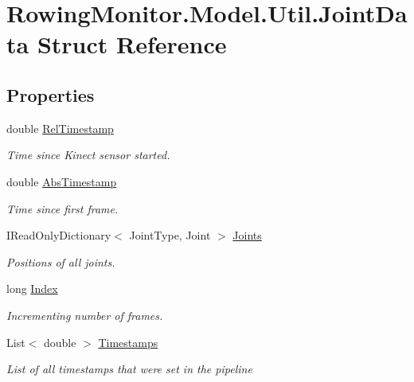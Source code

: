 \hypertarget{struct_rowing_monitor_1_1_model_1_1_util_1_1_joint_data}{}\section{Rowing\+Monitor.\+Model.\+Util.\+Joint\+Data Struct Reference}
\label{struct_rowing_monitor_1_1_model_1_1_util_1_1_joint_data}
\subsection*{Properties}
\begin{DoxyCompactItemize}
\item 
double \hyperlink{struct_rowing_monitor_1_1_model_1_1_util_1_1_joint_data_a56463d7bd16c6e5cad4e3619e9df9508}{Rel\+Timestamp}
\begin{DoxyCompactList}\small\item\em Time since Kinect sensor started. \end{DoxyCompactList}\item 
double \hyperlink{struct_rowing_monitor_1_1_model_1_1_util_1_1_joint_data_a2c951ee40b3e49be73b92cf39c5aa9ab}{Abs\+Timestamp}
\begin{DoxyCompactList}\small\item\em Time since first frame. \end{DoxyCompactList}\item 
I\+Read\+Only\+Dictionary$<$ Joint\+Type, Joint $>$ \hyperlink{struct_rowing_monitor_1_1_model_1_1_util_1_1_joint_data_afa67f920730db9679102686913774e69}{Joints}
\begin{DoxyCompactList}\small\item\em Positions of all joints. \end{DoxyCompactList}\item 
long \hyperlink{struct_rowing_monitor_1_1_model_1_1_util_1_1_joint_data_a2193c6359b3e9e2d6dfdb6178351a8b3}{Index}
\begin{DoxyCompactList}\small\item\em Incrementing number of frames. \end{DoxyCompactList}\item 
List$<$ double $>$ \hyperlink{struct_rowing_monitor_1_1_model_1_1_util_1_1_joint_data_a98bf571ea92c7f9b8e197062f17ddc27}{Timestamps}
\begin{DoxyCompactList}\small\item\em List of all timestamps that were set in the pipeline \end{DoxyCompactList}\end{DoxyCompactItemize}


